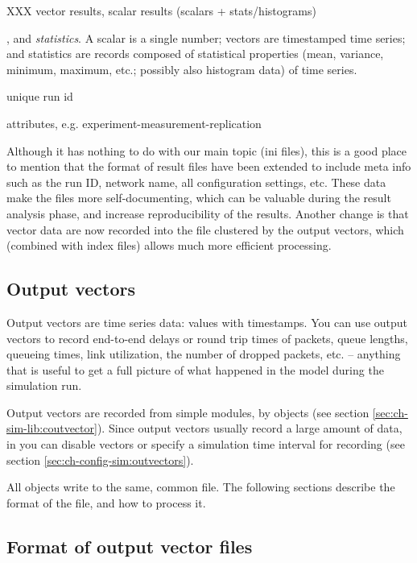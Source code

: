 XXX vector results, scalar results (scalars + stats/histograms)

, and \textit{statistics}. A scalar is a single number;
vectors are timestamped time series; and statistics are records composed of
statistical properties (mean, variance, minimum, maximum, etc.; possibly
also histogram data) of time series.

unique run id

attributes, e.g. experiment-measurement-replication

Although it has nothing to do with our main topic (ini files), this is a
good place to mention that the format of result files have been
extended to include meta info such as the run ID, network name, all
configuration settings, etc. These data make the files more
self-documenting, which can be valuable during the result analysis
phase, and increase reproducibility of the results. Another change is
that vector data are now recorded into the file clustered by the output
vectors, which (combined with index files) allows much more efficient
processing.



\subsection{Output vectors}
\label{sec:ch-ana-sim:output-vectors}

Output vectors are time series data: values with timestamps.
You can use output vectors to record end-to-end delays or
round trip times of packets, queue lengths, queueing times,
link utilization, the number of dropped packets, etc. --
anything that is useful to get a full picture of what happened
in the model during the simulation run.

Output vectors are recorded from simple modules, by  objects
(see section \ref{sec:ch-sim-lib:coutvector}). Since output vectors usually
record a large amount of data, in  you can disable vectors
or specify a simulation time interval for recording
(see section \ref{sec:ch-config-sim:outvectors}).

All  objects write to the same, common file.
The following sections describe the format of the file, and
how to process it.


\subsection{Format of output vector files}

